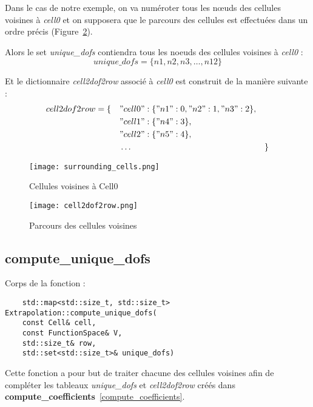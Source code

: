 Dans le cas de notre exemple, on va numéroter tous les nœuds des cellules voisines à \textit{cell0} et on supposera que le parcours des cellules est effectuées dans un ordre précis (Figure~\ref{fig4}).

Alors le set \textit{unique\_dofs} contiendra tous les noeuds des cellules voisines à \textit{cell0} : 
$$unique\_dofs = \{n1,n2,n3,\dots,n12\}$$

Et le dictionnaire \textit{cell2dof2row} associé à \textit{cell0} est construit de la manière suivante :
$$cell2dof2row = \begin{aligned}[t]
	\{\quad&"cell0":\{"n1":0,"n2":1,"n3":2\},&& \\
	&"cell1":\{"n4":3\}, \\
	&"cell2":\{"n5":4\}, \\
	&\dots &&\}
\end{aligned}$$

\begin{minipage}{0.48\linewidth}
	\begin{figure}[H]
		\centering
		\texttt{[image: surrounding\_cells.png]}
		\caption{Cellules voisines à Cell0}
		\label{fig3}
	\end{figure}
\end{minipage}
\begin{minipage}{0.48\linewidth}
	\begin{figure}[H]
		\centering
		\texttt{[image: cell2dof2row.png]}
		\caption{Parcours des cellules voisines}
		\label{fig4}
	\end{figure}
\end{minipage}


\subsection{compute\_unique\_dofs}
\label{compute_unique_dofs}

Corps de la fonction :

\begin{lstlisting}
	std::map<std::size_t, std::size_t> Extrapolation::compute_unique_dofs(
	const Cell& cell,
	const FunctionSpace& V,
	std::size_t& row,
	std::set<std::size_t>& unique_dofs)
\end{lstlisting}

Cette fonction a pour but de traiter chacune des cellules voisines afin de compléter les tableaux \textit{unique\_dofs} et \textit{cell2dof2row} créés dans \textbf{compute\_coefficients}~\ref{compute_coefficients}.\\

